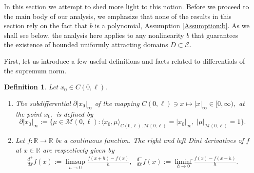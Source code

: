 \documentclass[10pt, reqno]{amsart}
\newcommand{\R}{\mathbb{R}}
\newcommand{\e}{\mathcal{E}}
\newtheorem{dfn}{Definition}
\theoremstyle{definition}
\numberwithin{lem}{section}
\numberwithin{cor}{section}
\numberwithin{prop}{section}
\numberwithin{thm}{section}
\numberwithin{dfn}{section}
\begin{document}
      In this section we attempt to shed more light to this notion. Before we proceed to the main body of our analysis, we emphasize that none of the results in this section rely on the fact that $b$ is a polynomial, Assumption \ref{Assumption:b}. As we shall see below, the analysis here applies to any nonlinearity $b$ that guarantees the existence of bounded uniformly attracting domains $D\subset\e$.

      First, let us introduce a few useful definitions and facts related to differentials of the supremum norm.









      



    

\begin{dfn} Let $x_0\in C(0,\ell).$
\begin{enumerate}
   \item The subdifferential $\partial |x_0|_\infty$ of the mapping $C(0,\ell)\ni x\mapsto|x|_\infty\in[0,\infty ), $ at the point $x_0,$ is defined by
$$ \partial |x_0|_\infty:=\big\{ \mu\in \mathcal{M}(0,\ell):  \langle x_0, \mu\rangle_{C(0,\ell), \mathcal{M}(0,\ell) }=|x_0|_{\infty},\; |\mu|_{\mathcal{M}(0,\ell)}=1     \big\}.$$
\item Let $f: \R\rightarrow \R$ be a continuous function.  The right and left  Dini derivatives of $f$ at $x\in\R$ are respectively given by
\begin{equation*}
    \begin{aligned}
        \frac{d^+}{dx}f(x):=\limsup_{h\to 0}\frac{f(x+h)-f(x)}{h},\;\; \frac{d^-}{dx}f(x):=\liminf_{h\to 0}\frac{f(x)-f(x-h)}{h}.
    \end{aligned}
\end{equation*}
\end{enumerate}
\end{dfn}
\end{document}
